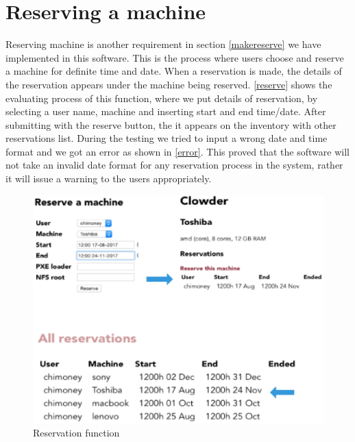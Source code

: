\section*{Reserving a machine}
Reserving machine is another requirement in section \ref{makereserve} we have implemented in this software. This is the process where users choose and reserve a machine for definite time and date. When a reservation is made, the details of the reservation appears under the machine being reserved. \autoref{reserve} shows the evaluating process of this function, where we put details of reservation, by selecting a user name, machine and inserting start and end time/date. After submitting with the reserve button, the it appears on the inventory with other reservations list. During the testing we tried to input a wrong date and time format and we got an error as shown in \autoref{error}. This proved that the software will not take an invalid date format for any reservation process in the system, rather it will issue a warning to the users appropriately.
\begin{figure}[h]
  \includegraphics[width=\linewidth]{reserve.eps}
  \caption{Reservation function}
  \label{reserve}
\end{figure}

